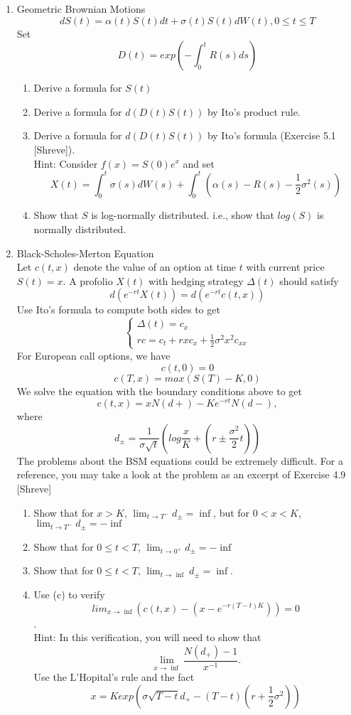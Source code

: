\documentclass[12pt]{article}
\begin{document}
\begin{enumerate}
\begin{enumerate}
\end{enumerate}
\newpage
\item Geometric Brownian Motions
\[dS(t) = \alpha(t)S(t)dt+\sigma(t)S(t)dW(t), 0\leq t\leq T\]
Set 
\[ D(t) = exp\left(-\int_0^t R(s)ds\right)\]
\begin{enumerate}
\item Derive a formula for $S(t)$
\item Derive a formula for $d(D(t)S(t))$ by Ito's product rule.
\item Derive a formula for $d(D(t)S(t))$ by Ito's formula (Exercise 5.1 [Shreve]). 
\\
Hint: Consider $f(x) = S(0)e^x$ and set 
\[
X(t) = \int_0^t \sigma(s)dW(s) + \int_0^t \left(\alpha(s)-R(s)-\frac12\sigma^2(s) \right)
\]
\item Show that $S$ is log-normally distributed. i.e., show that $log(S)$ is normally distributed.
\end{enumerate}
\newpage
\item Black-Scholes-Merton Equation
\\
Let $c(t,x)$ denote the value of an option at time $t$ with current price $S(t)=x$. A profolio $X(t)$ with hedging strategy $\Delta(t)$ should satisfy
\[
d(e^{-rt}X(t)) = d(e^{-rt}c(t,x))
\]
Use Ito's formula to compute both sides to get
\[
\left\{
\begin{array}{l}
\Delta(t) = c_x \\
rc = c_t +rxc_x + \frac12 \sigma^2 x^2 c_{xx}
\end{array}
\right.
\]
For European call options, we have
\[
c(t,0) = 0
\]
\[
c(T,x) = max(S(T)-K, 0)
\]
We solve the equation with the boundary conditions above to get 
\[
c(t,x)=xN(d+)-Ke^{-rt}N(d-),
\]
where
\[
d_{\pm} = \frac1{\sigma\sqrt{t}} \left(log \frac xK + \left(r\pm \frac {\sigma^2}{2}t \right) \right)
\]
The problems about the BSM equations could be extremely difficult. For a reference, you may take a look at the problem as an excerpt of Exercise 4.9 [Shreve]
\begin{enumerate}
\item Show that for $x>K$, $\lim_{t\to T^-}d_{\pm}=\inf$, but for $0< x< K$,  $\lim_{t\to T^-}d_{\pm}=-\inf$
\item Show that for $0\leq t<T$,  $\lim_{t\to 0^+}d_{\pm}=-\inf$
\item Show that for $0\leq t<T$,  $\lim_{t\to \inf}d_{\pm}=\inf$.
\item Use (c) to verify \[ lim_{x\to\inf} \left(c(t,x)-(x-e^{-r(T-t)K})\right)=0 \]. 
\\
Hint: In this verification, you will need to show that 
\[
\lim_{x\to\inf} \frac{N(d_+)-1}{x^{-1}}.
\]
Use the L'Hopital's rule and the fact
\[
x=K exp\left(\sigma\sqrt{T-t}d_+ - (T-t)\left(r+\frac12\sigma^2\right) \right)
\]
\end{enumerate}
\end{enumerate}
\end{document}
